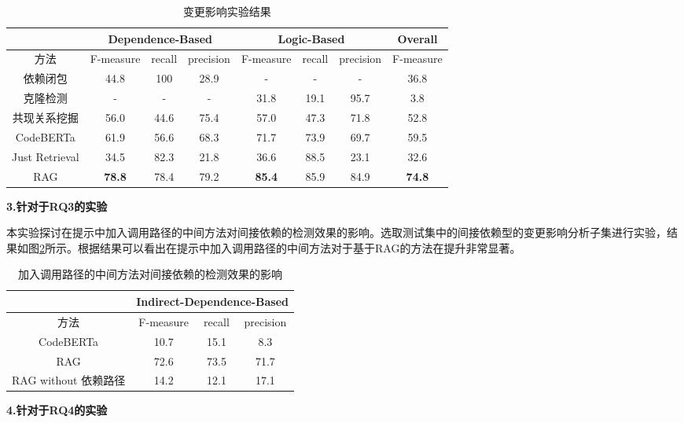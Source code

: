 \begin{table}[htbp]
\caption{变更影响实验结果}
\label{2_变更影响实验结果}
\vspace{0.5em}\centering\wuhao
\begin{tabular}{c|ccc|ccc|c}
\toprule
  & \multicolumn{3}{c|}{Dependence-Based} & \multicolumn{3}{c|}{Logic-Based} & Overall \\
\midrule
方法 & F-measure & recall & precision & F-measure & recall & precision  
 & F-measure\\
\midrule
依赖闭包 &  44.8 & 100 & 28.9 & - & - & - & 36.8 \\
克隆检测 &  - & - & - & 31.8 & 19.1 & 95.7 & 3.8\\
共现关系挖掘 &  56.0 & 44.6 & 75.4 & 57.0 & 47.3 & 71.8 & 52.8\\
CodeBERTa  &   61.9 & 56.6 & 68.3 & 71.7 & 73.9 & 69.7 &59.5\\
Just Retrieval   & 34.5 & 82.3 & 21.8 & 36.6 & 88.5 & 23.1 & 32.6\\
RAG & \textbf{78.8} & 78.4 & 79.2 & \textbf{85.4} & 85.9 & 84.9 & \textbf{74.8}\\
\bottomrule
\end{tabular}
\end{table}

\textbf{3.针对于RQ3的实验}

本实验探讨在提示中加入调用路径的中间方法对间接依赖的检测效果的影响。选取测试集中的间接依赖型的变更影响分析子集进行实验，结果如图\ref{2_消融实验}所示。根据结果可以看出在提示中加入调用路径的中间方法对于基于RAG的方法在提升非常显著。

\begin{table}[htbp]
\caption{加入调用路径的中间方法对间接依赖的检测效果的影响}
\label{2_消融实验}
\vspace{0.5em}\centering\wuhao
\begin{tabular}{cccc }
\toprule
  & \multicolumn{3}{c}{Indirect-Dependence-Based}  \\
\midrule
方法 & F-measure & recall & precision \\  
\midrule
CodeBERTa  &  10.7 & 15.1 & 8.3 \\
\midrule
RAG  & 72.6 & 73.5 & 71.7 \\
RAG without 依赖路径  & 14.2 & 12.1 & 17.1 \\
\bottomrule
\end{tabular}
\end{table}


\textbf{4.针对于RQ4的实验}

